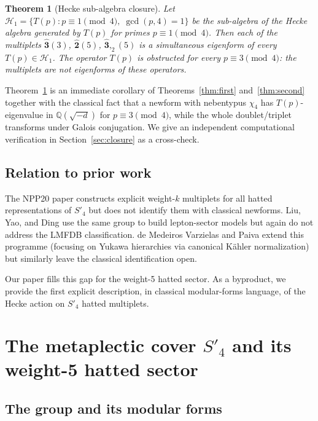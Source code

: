 \documentclass[12pt]{amsart}
\newtheorem{theorem}{Theorem}[section]
\theoremstyle{definition}
\newcommand{\Q}{\mathbb{Q}}
\newcommand{\hhat}[1]{\widehat{\mathbf{#1}}}  %
\newcommand{\HH}{\mathcal{H}_1}      %
\begin{document}
\begin{theorem}[Hecke sub-algebra closure]\label{thm:closure}
  Let $\HH = \{T(p) : p\equiv 1\pmod{4},\; \gcd(p,4)=1\}$
  be the sub-algebra of the Hecke algebra generated by $T(p)$ for
  primes $p \equiv 1 \pmod{4}$.  Then each of the multiplets
  $\hhat{3}(3)$, $\hhat{2}(5)$, $\hhat{3},_2(5)$ is a simultaneous
  eigenform of every $T(p)\in\HH$.  The operator $T(p)$ is
  \emph{obstructed} for every $p\equiv 3\pmod{4}$:
  the multiplets are not eigenforms of these operators.
\end{theorem}

Theorem~\ref{thm:closure} is an immediate corollary of
Theorems~\ref{thm:first} and~\ref{thm:second} together with the
classical fact that a newform with nebentypus $\chi_4$ has
$T(p)$-eigenvalue in $\Q(\sqrt{-d})$ for $p\equiv 3\pmod{4}$,
while the whole doublet/triplet transforms under Galois conjugation.
We give an independent computational verification in
Section~\ref{sec:closure} as a cross-check.

\subsection{Relation to prior work}

The NPP20 paper \cite{NPP20} constructs explicit weight-$k$ multiplets
for all hatted representations of $S'_4$ but does not identify them with
classical newforms.  Liu, Yao, and Ding \cite{LYD20} use the same
group to build lepton-sector models but again do not address the
LMFDB classification.  de Medeiros Varzielas and Paiva
\cite{dMVP26} extend this programme (focusing on Yukawa hierarchies via
canonical K\"ahler normalization) but similarly leave the classical
identification open.

Our paper fills this gap for the weight-5 hatted sector.  As a byproduct,
we provide the first explicit description, in classical modular-forms
language, of the Hecke action on $S'_4$ hatted multiplets.

\section{The metaplectic cover \texorpdfstring{$S'_4$}{S'4} and
         its weight-5 hatted sector}
\label{sec:setup}

\subsection{The group and its modular forms}
\end{document}

